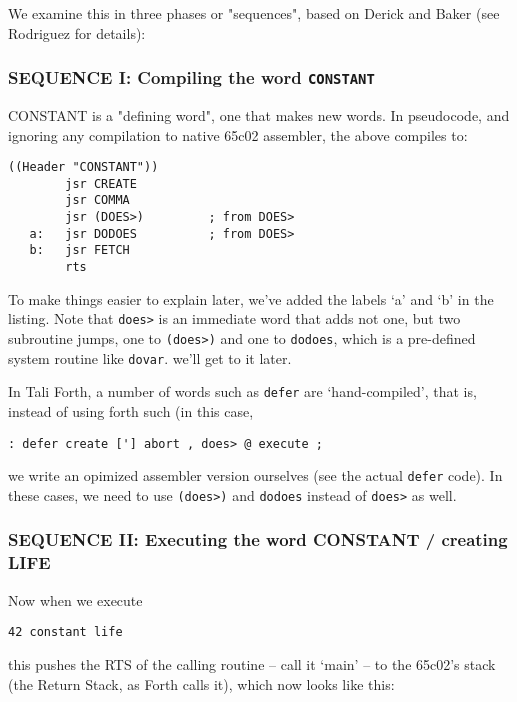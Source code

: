 We examine this in three phases or "sequences", based on Derick and Baker (see
Rodriguez for details):   


\subsubsection{SEQUENCE I: Compiling the word \texttt{CONSTANT}}

CONSTANT is a "defining word", one that makes new words. In pseudocode, and
ignoring any compilation to native 65c02 assembler, the above compiles to: 
\begin{lstlisting}[frame=single]
        ((Header "CONSTANT")) 
        jsr CREATE
        jsr COMMA
        jsr (DOES>)         ; from DOES>
   a:   jsr DODOES          ; from DOES>
   b:   jsr FETCH
        rts
\end{lstlisting}

To make things easier to explain later, we've added the labels `a' and `b' in
the listing. Note that \texttt{does>} is an immediate word that adds not one, but two
subroutine jumps, one to \texttt{(does>)} and one to \texttt{dodoes}, which is a pre-defined
system routine like \texttt{dovar}. we'll get to it later.

In Tali Forth, a number of words such as \texttt{defer} are
`hand-compiled', that is, instead of using forth such (in this case, 

\begin{lstlisting}[frame=single]
        : defer create ['] abort , does> @ execute ; 
\end{lstlisting}

we write an opimized assembler version ourselves (see the actual \texttt{defer}
code). In these cases, we need to use \texttt{(does>)} and \texttt{dodoes}
instead of \texttt{does>} as well.


\subsubsection{SEQUENCE II: Executing the word CONSTANT / creating LIFE }

Now when we execute

\begin{lstlisting}[frame=single]
        42 constant life
\end{lstlisting}

this pushes the RTS of the calling routine -- call it `main' -- to the 65c02's
stack (the Return Stack, as Forth calls it), which now looks like this:

